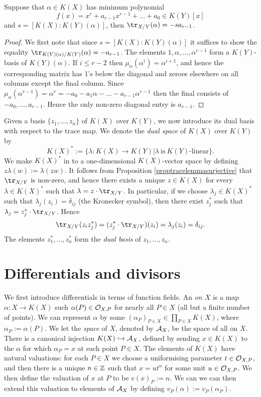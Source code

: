     \begin{lem} 
    Suppose that $\alpha \in K(X)$ has minimum polynomial 
        \[
        f(x) = x^r + a_{r-1}x^{r-1} + \ldots +a_0 \in K(Y)[x]
        \]
    and $s= [K(X):K(Y)(\alpha)]$, then $\tr_{X/Y}(\alpha) = -sa_{r-1}$.
    \end{lem}
    \begin{proof}
    We first note that since $s = [K(X):K(Y)(\alpha)]$ it suffices to show the equality $\tr_{K(Y)(\alpha)/K(Y)}(\alpha) = -a_{r-1}$.
    The elements $1, \alpha, \ldots, \alpha^{r-1}$ form a $K(Y)$-basis of $K(Y)(\alpha)$.
    If $i \leq r-2$ then $\mu_{\alpha}(\alpha^i) = \alpha^{i+1}$, and hence the corresponding matrix has 1's below the diagonal and zeroes elsewhere on all columns except the final column.
    Since $\mu_{\alpha}(\alpha^{r-1}) = \alpha^r = -a_0 - a_1\alpha - \ldots - a_{r-1}\alpha^{r-1}$ then the final consists of $-a_0, \ldots, a_{r-1}$.
    Hence the only non-zero diagonal entry is $a_{r-1}$.
    \end{proof}

            
Given a basis $\{z_1,\ldots,z_n\}$ of $K(X)$ over $K(Y)$, we now introduce its dual basis with respect to the trace map.
We denote the {\em dual space} of $K(X)$ over $K(Y)$ by 
    \[
    K(X)^*:=\{\lambda \colon K(X) \rightarrow K(Y)| \lambda\ \text{is}\ K(Y)\text{-linear}\}.
    \]
We make $K(X)^*$ in to a one-dimensional $K(X)$-vector space by defining $z \lambda(w):=\lambda(z w)$.
It follows from Proposition \ref{proptracelemmasurjective} that $\tr_{X/Y}$ is non-zero, and hence there exists a unique $z\in K(X)$ for every $\lambda \in K(X)^*$ such that $\lambda = z\cdot \tr_{X/Y}$.
In particular, if we choose $\lambda_j\in K(X)^*$ such that $\lambda_j(z_i) = \delta_{ij}$ (the Kronecker symbol), then there exist $z_j^*$ such that $\lambda_j = z_j^*\cdot \tr_{X/Y}$.
Hence
    \[
    \tr_{X/Y}(z_iz_j^*) = (z_j^*\cdot \tr_{X/Y})(z_i) = \lambda_j(z_i) = \delta_{ij}.
    \]
The elements $z_1^*, \ldots , z_n^*$ form the {\em dual basis} of $z_1, \ldots , z_n$.


\section{Differentials and divisors}

We first introduce differentials in terms of function fields.
An {\em \adele on $X$} is a map $\alpha\colon  X \rightarrow K(X)$ such $\alpha(P) \in {\cal O}_{X,P}$ for nearly all $P \in X$ (\ie all but a finite number of points).
We can represent $\alpha$ by some $(\alpha_P)_{P \in X} \in \prod_{P \in X} K(X)$, where $\alpha_P := \alpha(P)$.
We let the {\em \adele space} of $X$, denoted by ${\mathcal A}_X$, be the space of all \adeles on $X$.
There is a canonical injection $K(X) \hookrightarrow  {\mathcal A}_X$, defined by sending $x\in K(X)$ to the \adele $\alpha$ for which $\alpha_P =  x$ at each point $P\in X$.
The elements of $K(X)$ have natural valuations: for each $P\in X$ we choose a uniformising parameter $t\in {\cal O}_{X,P}$, and then there is a unique $n \in {\mathbb Z}$ such that $x=ut^n$ for some unit $u\in {\cal O}_{X,P}$.
We then define the valuation of $x$ at $P$ to be $v(x)_P := n$.
We can we can then extend this valuation to elements of ${\mathcal A}_X$ by defining $v_P(\alpha) := v_P(\alpha_P)$.

